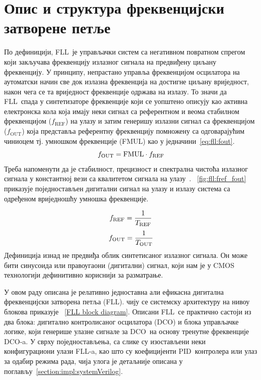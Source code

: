 \documentclass[master]{finthesis}
\def \FLL  {FLL} %
\def \DCO  {DCO} %
\def \PID  {PID} %
\begin{document}
\section{Опис и структура фреквенцијски затворене петље} \label{FLL structure}
По дефиницији, \FLL\ је управљачки систем са негативном повратном спрегом који закључава фреквенцију излазног сигнала на предвиђену циљану фреквенцију. У принципу, непрастано управља фреквенцијом осцилатора на аутоматски начин све док излазна фреквенција на достигне циљану вриједност, након чега се та вриједност фреквенције одржава на излазу. То значи да \FLL\ спада у синтетизаторе фреквенције који се уопштено описују као активна електронска кола која имају неки сигнал са референтном и веома стабилном фреквенцијом ($f_\text{REF}$) на улазу и затим генеришу излазни сигнал са фреквенцијом ($f_\text{OUT}$) која представља референтну фреквенцију помножену са одговарајућим чиниоцем тј. умношком фреквенције (FMUL) као у једначини~\ref{eq:fll:fout}.
\begin{equation}
	\label{eq:fll:fout}
	f_\text{OUT} = \text{FMUL} \cdot f_\text{REF}
        \vspace{0.3cm}
\end{equation}
Треба напоменути да је стабилност, прецизност и спектрална чистоћа излазног сигнала у константној вези са квалитетом сигнала на улазу~\cite{Staszewski:FREQUENCY_SYNTHESIZER_CMOS_2005}. \figurename~\ref{fig:fll:fref_fout} приказује поједностављен дигитални сигнал на улазу и излазу система са одређеном вриједношћу умношка фреквенције. \par

\begin{equation}
	f_\text{REF} = \frac{1}{T_\text{REF}}
        \vspace{0.2cm}
\end{equation}
\begin{equation}
	f_\text{OUT} = \frac{1}{T_\text{OUT}}
        \vspace{0.3cm}
\end{equation}
Дефиниција изнад не предвиђа облик синтетисаног излазног сигнала. Он може бити синусоида или правоугаони (дигитални) сигнал, који нам је у CMOS технологији дефинитивно кориснији за разматрање. \par 
У овом раду описана је релативно једноставна али ефикасна дигитална фреквенцијски затворена петља (\FLL). чију се системску архитектуру на нивоу блокова приказује \figurename~\ref{FLL block diagram}. Описани \FLL\ се практично састоји из два блока: дигитално контролисаног осцилатора (\DCO) и блока управљачке логике, који генерише улазне сигнале за \DCO\ на основу тренутне фреквенције \DCO-a. У сврху поједностављења, са слике су изостављени неки конфигурациони улази \FLL-a, као што су коефицијенти \PID\ контролера или улаз за одабир режима рада, чија улога је детаљније описана у поглављу~\ref{section:impl:systemVerilog}. 
\end{document}
